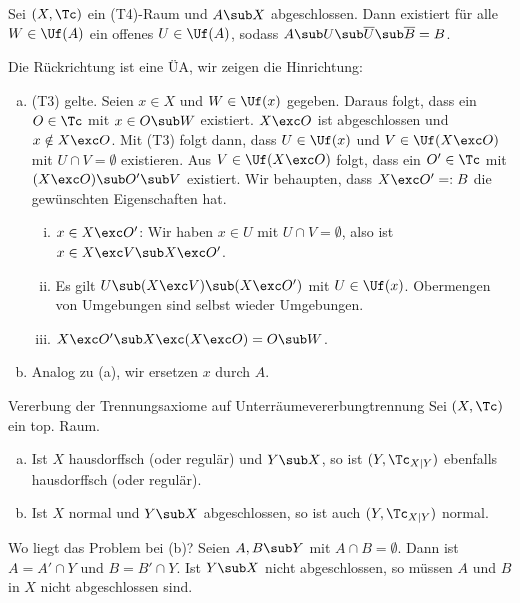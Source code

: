 \begin{bemerkung}
Sei $(X, \Tc)$ ein (T4)-Raum und $A \sub X$ abgeschlossen. Dann existiert für alle $W \in \Uf(A)$ ein offenes $U \in \Uf(A)$, sodass $A \sub U \sub \overline{U} \sub \overline{B}=B$.
\end{bemerkung}
\begin{beweis}
Die Rückrichtung ist eine ÜA, wir zeigen die Hinrichtung:
\begin{enumerate}[(a)]
\item (T3) gelte. Seien $x \in X$ und $W \in \Uf(x)$ gegeben. Daraus folgt, dass ein $O \in \Tc$ mit $x \in O \sub W$ existiert. $X \exc O$ ist abgeschlossen und $x \notin X \exc O$. Mit (T3) folgt dann, dass $U \in \Uf(x)$ und $V \in \Uf(X \exc O)$ mit $U \cap V = \emptyset$ existieren. Aus $V \in \Uf(X \exc O)$ folgt, dass ein $O' \in \Tc$ mit $(X \exc O) \sub O' \sub V$ existiert. Wir behaupten, dass $X \exc O' =: B$ die gewünschten Eigenschaften hat.
\begin{enumerate}[(i)]
\item $x \in X \exc O'$: Wir haben $x \in U$ mit $U \cap V = \emptyset$, also ist $x \in X \exc V \sub X \exc O'$.
\item Es gilt $U \sub (X \exc V) \sub (X \exc O')$ mit $U \in \Uf(x)$. Obermengen von Umgebungen sind selbst wieder Umgebungen.
\item $X \exc O' \sub X \exc (X \exc O) = O \sub W$.
\end{enumerate}
\item Analog zu (a), wir ersetzen $x$ durch $A$.
\end{enumerate}
\end{beweis}
\begin{satz}{Vererbung der Trennungsaxiome auf Unterräume}{vererbungtrennung}
Sei $(X, \Tc)$ ein top. Raum.
\begin{enumerate}[(a)]
\item Ist $X$ hausdorffsch (oder regulär) und $Y \sub X$, so ist $(Y, \Tc_{X|Y})$ ebenfalls hausdorffsch (oder regulär).
\item Ist $X$ normal und $Y \sub X$ abgeschlossen, so ist auch $(Y, \Tc_{X|Y})$ normal.
\end{enumerate}
\end{satz}
\begin{bemerkung}
Wo liegt das Problem bei (b)? Seien $A,B \sub Y$ mit $A \cap B = \emptyset$. Dann ist $A= A' \cap Y$ und $B = B' \cap Y$. Ist $Y \sub X$ nicht abgeschlossen, so müssen $A$ und $B$ in $X$ nicht abgeschlossen sind.
\end{bemerkung}